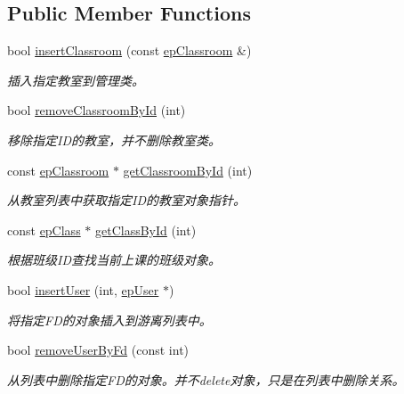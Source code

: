 \subsection*{\-Public \-Member \-Functions}
\begin{DoxyCompactItemize}
\item 
bool \hyperlink{classepManager_acd6212dc426ebfdf0fd1e427b3dcc801}{insert\-Classroom} (const \hyperlink{classepClassroom}{ep\-Classroom} \&)
\begin{DoxyCompactList}\small\item\em 插入指定教室到管理类。 \end{DoxyCompactList}\item 
bool \hyperlink{classepManager_ae093930a20d97d4b8b2cb7f644631845}{remove\-Classroom\-By\-Id} (int)
\begin{DoxyCompactList}\small\item\em 移除指定\-I\-D的教室，并不删除教室类。 \end{DoxyCompactList}\item 
const \hyperlink{classepClassroom}{ep\-Classroom} $\ast$ \hyperlink{classepManager_aaf31376adba61f3da5b326cb853d4af9}{get\-Classroom\-By\-Id} (int)
\begin{DoxyCompactList}\small\item\em 从教室列表中获取指定\-I\-D的教室对象指针。 \end{DoxyCompactList}\item 
const \hyperlink{classepClass}{ep\-Class} $\ast$ \hyperlink{classepManager_a211e4c8bea19e26967c534b4c43b2411}{get\-Class\-By\-Id} (int)
\begin{DoxyCompactList}\small\item\em 根据班级\-I\-D查找当前上课的班级对象。 \end{DoxyCompactList}\item 
bool \hyperlink{classepManager_a5b9c6ca185e58a7f9fe5488e4f624447}{insert\-User} (int, \hyperlink{classepUser}{ep\-User} $\ast$)
\begin{DoxyCompactList}\small\item\em 将指定\-F\-D的对象插入到游离列表中。 \end{DoxyCompactList}\item 
bool \hyperlink{classepManager_a732a9bdcc0df899a3dc279111e58f2f9}{remove\-User\-By\-Fd} (const int)
\begin{DoxyCompactList}\small\item\em 从列表中删除指定\-F\-D的对象。并不delete对象，只是在列表中删除关系。 \end{DoxyCompactList}\item 

\end{DoxyCompactItemize}
